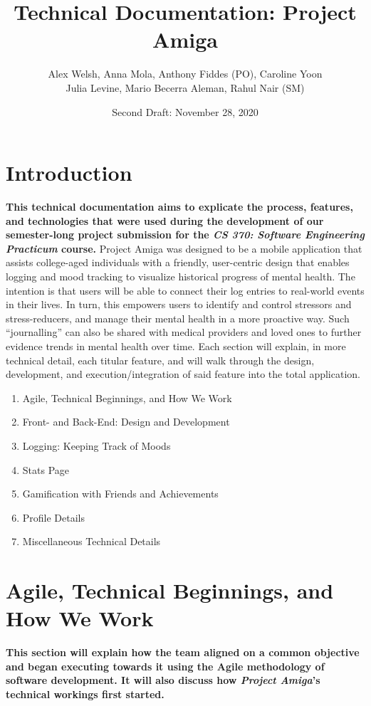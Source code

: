 \documentclass[10pt,american english]{article}
\title{Technical Documentation: Project Amiga}
\author{Alex Welsh, Anna Mola, Anthony Fiddes (PO), Caroline Yoon\\ Julia Levine, Mario Becerra Aleman, Rahul Nair (SM)}
\date{Second Draft: November 28, 2020}
\begin{document}
\maketitle
\section*{Introduction}
\textbf{This technical documentation aims to explicate the process, features, and technologies that were used during the development of our semester-long project submission for the\textit{ CS 370: Software Engineering Practicum} course.}
\newline \newline 
Project Amiga was designed to be a mobile application that assists college-aged individuals with a friendly, user-centric design that enables logging and mood tracking to visualize historical progress of mental health. The intention is that users will be able to connect their log entries to real-world events in their lives. In turn, this empowers users to identify and control stressors and stress-reducers, and manage their mental health in a more proactive way. Such ``journalling'' can also be shared with medical providers and loved ones to further evidence trends in mental health over time. 
\newline \newline 
Each section will explain, in more technical detail, each titular feature, and will walk through the design, development, and execution/integration of said feature into the total application.
\begin{enumerate}
\item Agile, Technical Beginnings, and How We Work
\item Front- and Back-End: Design and Development
\item Logging: Keeping Track of Moods
\item Stats Page
\item Gamification with Friends and Achievements
\item Profile Details
\item Miscellaneous Technical Details
\end{enumerate}

\section*{Agile, Technical Beginnings, and How We Work}
\textbf{This section will explain how the team aligned on a common objective and began executing towards it using the Agile methodology of software development. It will also discuss how \textit{Project Amiga}'s technical workings first started.}
\end{document}

